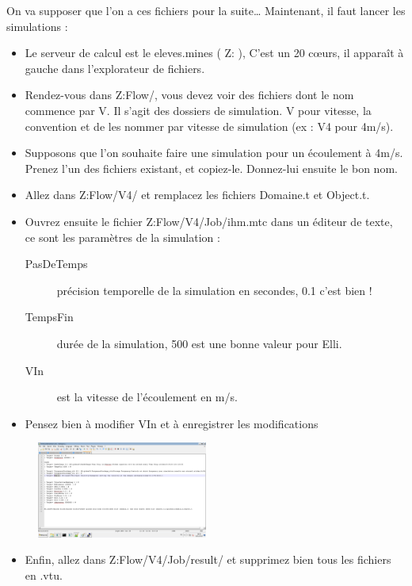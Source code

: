 \documentclass[a4paper, 11pt]{report}
\begin{document}
On va supposer que l’on a ces fichiers pour la suite… Maintenant, il faut lancer les simulations :

\begin{itemize}
\item Le serveur de calcul est le eleves.mines ( Z: ), C’est un 20 cœurs, il apparaît à gauche dans l’explorateur de fichiers.
\item Rendez-vous dans Z:Flow/, vous devez voir des fichiers dont le nom commence par V. Il s’agit des dossiers de simulation. V pour vitesse, la convention et de les nommer par vitesse de simulation (ex : V4 pour 4m/s).
\item Supposons que l’on souhaite faire une simulation pour un écoulement à 4m/s. Prenez l’un des fichiers existant, et copiez-le. Donnez-lui ensuite le bon nom.
\item Allez dans Z:Flow/V4/ et remplacez les fichiers Domaine.t et Object.t.
\item Ouvrez ensuite le fichier Z:Flow/V4/Job/ihm.mtc dans un éditeur de texte, ce sont les paramètres de la simulation :
\begin{description}
\item[PasDeTemps]précision temporelle de la simulation en secondes, 0.1 c’est bien !
\item[TempsFin]durée de la simulation, 500 est une bonne valeur pour Elli.
\item[VIn]est la vitesse de l’écoulement en m/s.
\end{description}
\item Pensez bien à modifier VIn et à enregistrer les modifications
\end{itemize}

\begin{figure}[h]
	\begin{center}	\includegraphics[width=0.5\textwidth]{images/CFD1.png}
	\end{center}
\end{figure}

\begin{itemize}
\item Enfin, allez dans Z:Flow/V4/Job/result/ et supprimez bien tous les fichiers en .vtu.
\end{itemize}
\end{document}
